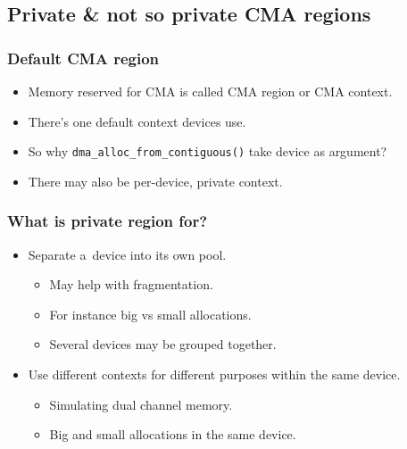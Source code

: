 \subsection{Private \& not so private CMA regions}

\begin{frame}
  \frametitle{Default CMA region}

  \begin{itemize}
  \item Memory reserved for CMA is called CMA region or CMA context.
  \item There's one default context devices use.
  \item So why \lstinline|dma_alloc_from_contiguous()| take device as
    argument?
  \item There may also be per-device, private context.
  \end{itemize}
\end{frame}

\begin{frame}
  \frametitle{What is private region for?}

  \begin{itemize}
  \item Separate a~device into its own pool.
    \begin{itemize}
    \item May help with fragmentation.
    \item For instance big vs small allocations.
    \item Several devices may be grouped together.
    \end{itemize}
  \item Use different contexts for different purposes within the same
    device.
    \begin{itemize}
    \item Simulating dual channel memory.
    \item Big and small allocations in the same device.
    \end{itemize}
  \end{itemize}
\end{frame}

